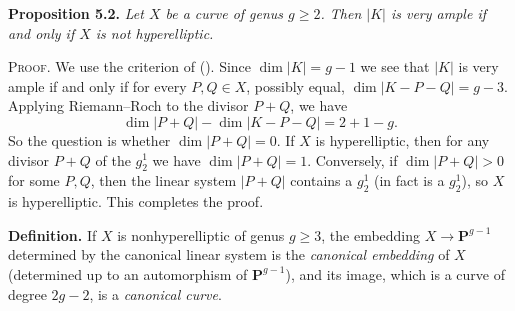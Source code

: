 {\medskip
\noindent\hypertarget{result-IV-5.2}{}\textbf{Proposition 5.2.} \emph{Let $X$ be a curve of genus $g\ge2$. Then $|K|$ is very ample if and only if $X$ is not hyperelliptic.}

\smallskip
\noindent\textsc{Proof.} We use the criterion of (). Since $\dim|K|=g-1$ we see that $|K|$ is very ample if and only if for every $P,Q\in X$, possibly equal, $\dim|K-P-Q|=g-3$. Applying Riemann--Roch to the divisor $P+Q$, we have
\[
\dim|P+Q|-\dim|K-P-Q|=2+1-g.
\]
So the question is whether $\dim|P+Q|=0$. If $X$ is hyperelliptic, then for any divisor $P+Q$ of the $g_2^1$ we have $\dim|P+Q|=1$. Conversely, if $\dim|P+Q|>0$ for some $P,Q$, then the linear system $|P+Q|$ contains a $g_2^1$ (in fact is a $g_2^1$), so $X$ is hyperelliptic. This completes the proof.

\medskip
\noindent\textbf{Definition.} If $X$ is nonhyperelliptic of genus $g\ge3$, the embedding $X\to\mathbf P^{g-1}$ determined by the canonical linear system is the \emph{canonical embedding} of $X$ (determined up to an automorphism of $\mathbf P^{g-1}$), and its image, which is a curve of degree $2g-2$, is a \emph{canonical curve}.}
